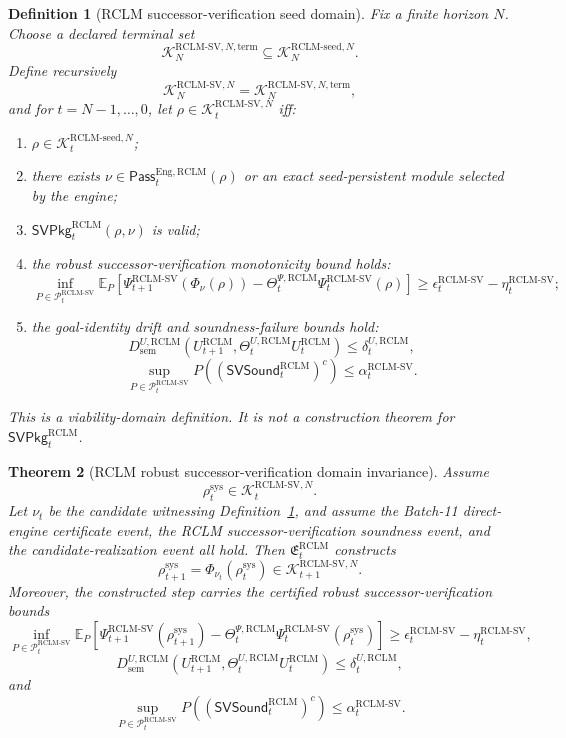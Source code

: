 \documentclass[11pt,a4paper]{article}
\newtheorem{theorem}{Theorem}[section]
\newtheorem{definition}[theorem]{Definition}
\newcommand{\Pcal}{\mathcal P}
\newcommand{\Kcal}{\mathcal K}
\newcommand{\RCLM}{\mathrm{RCLM}}
\newcommand{\sem}{\mathrm{sem}}
\newcommand{\sys}{\mathrm{sys}}
\newcommand{\Eng}{\mathrm{Eng}}
\begin{document}
\begin{definition}[RCLM successor-verification seed domain]
\label{def:rclm-batch12-sv-seed-domain}
Fix a finite horizon \(N\). Choose a declared terminal set
\[
\Kcal_N^{\RCLM\text{-}\mathrm{SV},N,\mathrm{term}}
\subseteq
\Kcal_N^{\RCLM\text{-}\mathrm{seed},N}.
\]
Define recursively
\[
\Kcal_N^{\RCLM\text{-}\mathrm{SV},N}
=
\Kcal_N^{\RCLM\text{-}\mathrm{SV},N,\mathrm{term}},
\]
and for \(t=N-1,\ldots,0\), let \(\rho\in\Kcal_t^{\RCLM\text{-}\mathrm{SV},N}\) iff:
\begin{enumerate}[label=(\roman*),leftmargin=1.5em]
    \item \(\rho\in\Kcal_t^{\RCLM\text{-}\mathrm{seed},N}\);
    \item there exists \(\nu\in\mathsf{Pass}_t^{\Eng,\RCLM}(\rho)\) or an exact seed-persistent module selected by the engine;
    \item \(\mathsf{SVPkg}_t^{\RCLM}(\rho,\nu)\) is valid;
    \item the robust successor-verification monotonicity bound holds:
    \[
    \inf_{P\in\Pcal_t^{\RCLM\text{-}\mathrm{SV}}}
    \mathbb E_P\!
    \left[
    \Psi_{t+1}^{\RCLM\text{-}\mathrm{SV}}(\Phi_\nu(\rho))
    -
    \Theta_t^{\Psi,\RCLM}\Psi_t^{\RCLM\text{-}\mathrm{SV}}(\rho)
    \right]
    \ge
    \epsilon_t^{\RCLM\text{-}\mathrm{SV}}-
    \eta_t^{\RCLM\text{-}\mathrm{SV}};
    \]
    \item the goal-identity drift and soundness-failure bounds hold:
    \[
    D_{\sem}^{U,\RCLM}(U_{t+1}^{\RCLM},\Theta_t^{U,\RCLM}U_t^{\RCLM})
    \le
    \delta_t^{U,\RCLM},
    \]
    \[
    \sup_{P\in\Pcal_t^{\RCLM\text{-}\mathrm{SV}}}
    P((\mathsf{SVSound}_t^{\RCLM})^c)
    \le
    \alpha_t^{\RCLM\text{-}\mathrm{SV}}.
    \]
\end{enumerate}
This is a viability-domain definition. It is not a construction theorem for \(\mathsf{SVPkg}_t^{\RCLM}\).
\end{definition}

\begin{theorem}[RCLM robust successor-verification domain invariance]
\label{thm:rclm-batch12-sv-domain-invariance}
Assume
\[
\rho_t^{\sys}\in\Kcal_t^{\RCLM\text{-}\mathrm{SV},N}.
\]
Let \(\nu_t\) be the candidate witnessing Definition~\ref{def:rclm-batch12-sv-seed-domain}, and assume the Batch-11 direct-engine certificate event, the RCLM successor-verification soundness event, and the candidate-realization event all hold. Then \(\mathfrak E_t^{\RCLM}\) constructs
\[
\rho_{t+1}^{\sys}=\Phi_{\nu_t}(\rho_t^{\sys})
\in
\Kcal_{t+1}^{\RCLM\text{-}\mathrm{SV},N}.
\]
Moreover, the constructed step carries the certified robust successor-verification bounds
\[
\inf_{P\in\Pcal_t^{\RCLM\text{-}\mathrm{SV}}}
\mathbb E_P
\left[
\Psi_{t+1}^{\RCLM\text{-}\mathrm{SV}}(\rho_{t+1}^{\sys})
-
\Theta_t^{\Psi,\RCLM}\Psi_t^{\RCLM\text{-}\mathrm{SV}}(\rho_t^{\sys})
\right]
\ge
\epsilon_t^{\RCLM\text{-}\mathrm{SV}}-
\eta_t^{\RCLM\text{-}\mathrm{SV}},
\]
\[
D_{\sem}^{U,\RCLM}(U_{t+1}^{\RCLM},\Theta_t^{U,\RCLM}U_t^{\RCLM})
\le
\delta_t^{U,\RCLM},
\]
and
\[
\sup_{P\in\Pcal_t^{\RCLM\text{-}\mathrm{SV}}}
P((\mathsf{SVSound}_t^{\RCLM})^c)
\le
\alpha_t^{\RCLM\text{-}\mathrm{SV}}.
\]
\end{theorem}
\end{document}
